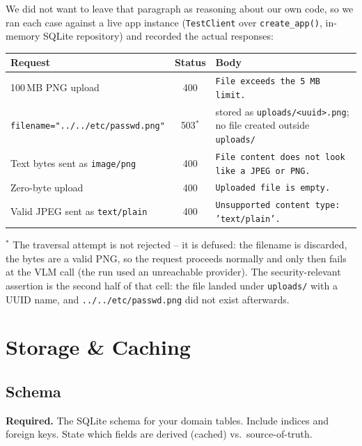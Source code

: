\documentclass[11pt,a4paper]{article}
\newenvironment{deliverbox}{\begin{deliverboxshown}}{\end{deliverboxshown}}
\newenvironment{deliverbox}{\setbox0\vbox\bgroup}{\egroup\ignorespacesafterend}
\begin{document}
\par\noindent
We did not want to leave that paragraph as reasoning about our own code,
so we ran each case against a live app instance (\texttt{TestClient} over
\texttt{create\_app()}, in-memory SQLite repository) and recorded the
actual responses:

\begin{center}\small
\begin{tabular}{p{6.6cm}cp{6.0cm}}
\toprule
\textbf{Request} & \textbf{Status} & \textbf{Body} \\
\midrule
100\,MB PNG upload & 400 & \texttt{File exceeds the 5 MB limit.} \\
\texttt{filename="../../etc/passwd.png"} & 503\footnotesize$^{*}$ & stored as \texttt{uploads/<uuid>.png}; no file created outside \texttt{uploads/} \\
Text bytes sent as \texttt{image/png} & 400 & \texttt{File content does not look like a JPEG or PNG.} \\
Zero-byte upload & 400 & \texttt{Uploaded file is empty.} \\
Valid JPEG sent as \texttt{text/plain} & 400 & \texttt{Unsupported content type: 'text/plain'.} \\
\bottomrule
\end{tabular}
\end{center}

{\footnotesize$^{*}$ The traversal attempt is not rejected -- it is
defused: the filename is discarded, the bytes are a valid PNG, so the
request proceeds normally and only then fails at the VLM call (the run
used an unreachable provider). The security-relevant assertion is the
second half of that cell: the file landed under \texttt{uploads/} with a
UUID name, and \texttt{../../etc/passwd.png} did not exist afterwards.}

\section{Storage \& Caching}\label{sec:storage}

\subsection{Schema}

\begin{deliverbox}
\textbf{Required.} The SQLite schema for your domain tables. Include indices and foreign keys. State which fields are derived (cached) vs.\ source-of-truth.
\end{deliverbox}
\end{document}
